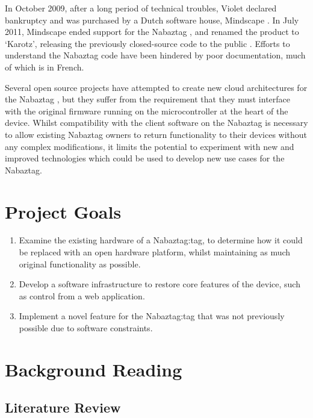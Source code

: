 \documentclass[12pt, a4paper]{article}
\begin{document}
		In October 2009, after a long period of technical troubles, Violet declared bankruptcy and was purchased by a Dutch software house, Mindscape \parencite{mindscapebuysviolet}. In July 2011, Mindscape ended support for the Nabaztag \parencite{nabaztagdead}, and renamed the product to `Karotz', releasing the previously closed-source code to the public \parencite{karotzandsource}. Efforts to understand the Nabaztag code have been hindered by poor documentation, much of which is in French.
				
		Several open source projects have attempted to create new cloud architectures for the Nabaztag \parencite{openjabnab, nabaztaglives}, but they suffer from the requirement that they must interface with the original firmware running on the microcontroller at the heart of the device. Whilst compatibility with the client software on the Nabaztag is necessary to allow existing Nabaztag owners to return functionality to their devices without any complex modifications, it limits the potential to experiment with new and improved technologies which could be used to develop new use cases for the Nabaztag.	
	
	\section{Project Goals}\label{sec:goals}
	
		\begin{enumerate}
			\item Examine the existing hardware of a Nabaztag:tag, to determine how it could be replaced with an open hardware platform, whilst maintaining as much original functionality as possible.
			\item Develop a software infrastructure to restore core features of the device, such as control from a web application.
			\item Implement a novel feature for the Nabaztag:tag that was not previously possible due to software constraints.
		\end{enumerate}
	
	\section{Background Reading}
	
	\subsection{Literature Review}\label{sec:litreview}
	
\end{document}
